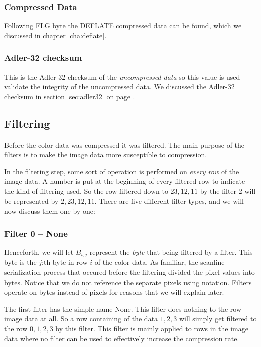 \subsubsection{Compressed Data}

Following FLG byte the DEFLATE compressed data can be found, which we
discussed in chapter \ref{cha:deflate}.

\subsubsection{Adler-32 checksum}

This is the Adler-32 checksum of the \textit{uncompressed data} so
this value is used validate the integrity of the uncompressed data. We
discussed the Adler-32 checksum in section \ref{sec:adler32} on page
\pageref{sec:adler32}.

\subsection{Filtering}
\label{sec:png-filters}

Before the color data was compressed it was filtered. The main purpose
of the filters is to make the image data more susceptible to
compression.

In the filtering step, some sort of operation is performed on
\textit{every row} of the image data. A number is put at the beginning
of every filtered row to indicate the kind of filtering used. So the
row filtered down to $23,12,11$ by the filter $2$ will be represented
by $2, 23,12,11$. There are five different filter types, and we will
now discuss them one by one:

\subsubsection{Filter 0 -- None}

Henceforth, we will let $B_{i,j}$ represent the \textit{byte} that
being filtered by a filter. This byte is the $j$:th byte in row $i$ of
the color data. As familiar, the scanline serialization process that
occured before the filtering divided the pixel values into
bytes. Notice that we do not reference the separate pixels using
notation. Filters operate on bytes instead of pixels for reasons that
we will explain later.

The first filter has the simple name None. This filter does nothing to
the row image data at all. So a row containing of the data $1,2,3$
will simply get filtered to the row $0,1,2,3$ by this filter. This
filter is mainly applied to rows in the image data where no filter can
be used to effectively increase the compression rate.

